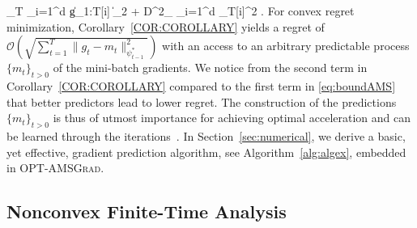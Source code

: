 \documentclass[wcp]{jmlr}
\begin{document}
\beq\label{eq:boundAMS}
_T \leq {} \sum_{i=1}^d \| g_{1:T}[i]  \|_2 + D^2_{\infty} \sum_{i=1}^d _T[i]^2 \eqsp.
\eeq
For convex regret minimization, Corollary~\ref{COR:COROLLARY} yields a regret of $\mathcal{O}(\sqrt{\sum_{t=1}^T \| g_t - m_t  \|^2_{\psi^*_{t-1}}})$ with an access to an arbitrary predictable process $\{m_t\}_{t>0}$ of the mini-batch gradients.
We notice from the second term in Corollary~\ref{COR:COROLLARY} compared to the first term in \eqref{eq:boundAMS} that better predictors lead to lower regret.
The construction of the predictions $\{m_t\}_{t>0}$ is thus of utmost importance for achieving optimal acceleration and can be learned through the iterations~\citep{RS13b}.
In Section~\ref{sec:numerical}, we derive a basic, yet effective, gradient prediction algorithm, see Algorithm~\ref{alg:algex}, embedded in \textsc{OPT-AMSGrad}.

\vspace{-0.05in}
\subsection{Nonconvex Finite-Time Analysis}
\vspace{-0.05in}
\end{document}

